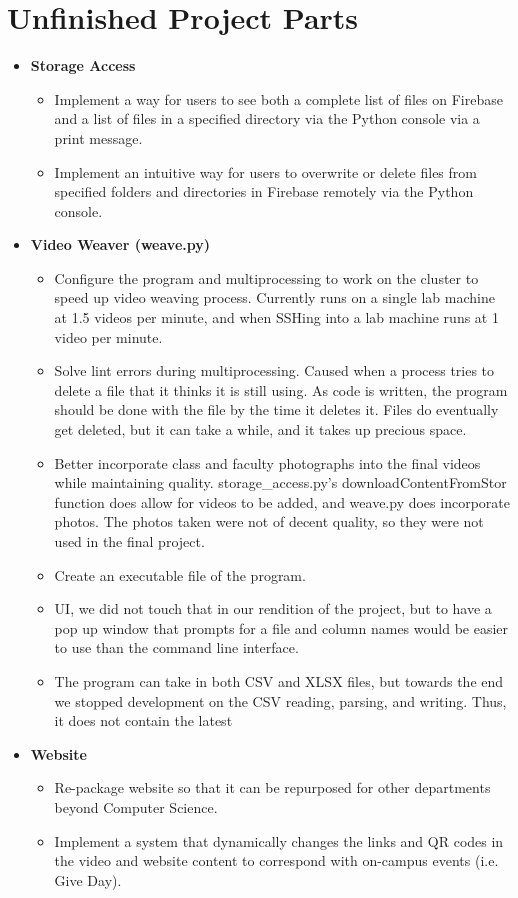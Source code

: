 \documentclass{article}
\begin{document}
\section{Unfinished Project Parts}
\begin{itemize}
    \item  \bf{Storage Access}
    \begin{itemize}
        \item Implement a way for users to see both a complete list of files on Firebase and a 
	list of files in a specified directory via the Python console via a print message.
        \item Implement an intuitive way for users to overwrite or delete files from specified folders and directories in Firebase remotely via the Python console.
    \end{itemize}
    \item  \bf{Video Weaver (weave.py)}
    \begin{itemize}
        \item Configure the program and multiprocessing to work on the cluster to speed up video weaving process. Currently runs on a single lab machine at 1.5 videos per minute, and when SSHing into a lab machine runs at 1 video per minute.
        \item Solve lint errors during multiprocessing. Caused when a process tries to delete a file that it thinks it is still using. As code is written, the program should be done with the file by the time it deletes it. Files do eventually get deleted, but it can take a while, and it takes up precious space.
        \item Better incorporate class and faculty photographs into the final videos while maintaining quality. storage\_access.py's downloadContentFromStor function does allow for videos to be added, and weave.py does incorporate photos. The photos taken were not of decent quality, so they were not used in the final project. 
        \item Create an executable file of the program.
        \item UI, we did not touch that in our rendition of the project, but to have a pop up window that prompts for a file and column names would be easier to use than the command line interface.
        \item The program can take in both CSV and XLSX files, but towards the end we stopped development on the CSV reading, parsing, and writing. Thus, it does not contain the latest  
    \end{itemize}
    \item \bf{Website}
    \begin{itemize}
        \item Re-package website so that it can be repurposed for other departments beyond Computer Science.
        \item Implement a system that dynamically changes the links and QR codes in the video and website content to correspond with on-campus events (i.e. Give Day).
    \end{itemize}
\end{itemize}
\end{document}
